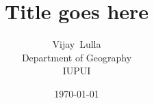 \documentclass[letterpaper,11pt]{article}
\title{Title goes here}
\author{Vijay~Lulla\\
  Department of Geography\\
  IUPUI}
\date{\today}
\begin{document}
\nocite{*}
\printbibliography %
\end{document}
